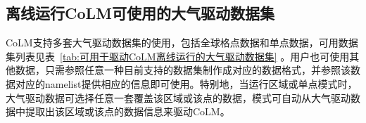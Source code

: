 \subsection{离线运行CoLM可使用的大气驱动数据集}
CoLM支持多套大气驱动数据集的使用，包括全球格点数据和单点数据，可用数据集列表见表~\ref{tab:可用于驱动CoLM离线运行的大气驱动数据集} 。用户也可使用其他数据，只需参照任意一种目前支持的数据集制作成对应的数据格式，并参照该数据对应的namelist提供相应的信息即可使用。特别地，当运行区域或单点模式时，大气驱动数据可选择任意一套覆盖该区域或该点的数据，模式可自动从大气驱动数据中提取出该区域或该点的数据信息来驱动CoLM。


